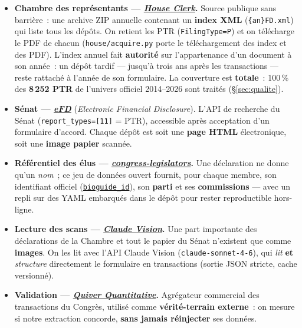 \documentclass[11pt,a4paper]{article}
\newcommand{\co}[1]{\texttt{\small #1}}
\begin{document}
\begin{itemize}[leftmargin=1.4em]
\item \textbf{Chambre des représentants — \href{https://disclosures-clerk.house.gov/FinancialDisclosure}{\emph{House Clerk}}.} Source publique sans barrière~: une archive
ZIP annuelle contenant un \textbf{index XML} (\co{\{an\}FD.xml}) qui liste tous les dépôts. On retient les
PTR (\co{FilingType=P}) et on télécharge le PDF de chacun (\co{house/acquire.py} porte le téléchargement
des index et des PDF). L'index annuel fait \textbf{autorité} sur l'appartenance d'un document à son
année~: un dépôt tardif — jusqu'à trois ans après les transactions — reste rattaché à l'année de son
formulaire. La couverture est \textbf{totale}~: 100\,\% des \textbf{8\,252 PTR} de l'univers officiel
2014--2026 sont traités (\S{}\ref{sec:qualite}).
\item \textbf{Sénat — \href{https://efdsearch.senate.gov/search/home/}{\emph{eFD}}} (\emph{Electronic Financial Disclosure}). L'API de recherche du Sénat
(\co{report_types=[11]} = PTR), accessible après acceptation d'un formulaire d'accord. Chaque dépôt est
soit une \textbf{page HTML} électronique, soit une \textbf{image papier} scannée.
\item \textbf{Référentiel des élus — \href{https://github.com/unitedstates/congress-legislators}{\emph{congress-legislators}}.}\label{sec:reference} Une déclaration ne
donne qu'un \emph{nom}~; ce jeu de données ouvert fournit, pour chaque membre, son identifiant officiel
(\href{https://bioguide.congress.gov/}{\co{bioguide_id}}), son \textbf{parti} et ses \textbf{commissions} — avec un repli sur des YAML embarqués
dans le dépôt pour rester reproductible hors-ligne.
\item \textbf{Lecture des scans — \href{https://www.anthropic.com}{\emph{Claude Vision}}.}\label{sec:vision} Une part importante des déclarations de la
Chambre et tout le papier du Sénat n'existent que comme \textbf{images}. On les lit avec l'API Claude
Vision (\co{claude-sonnet-4-6}), qui \emph{lit} \textbf{et} \emph{structure} directement le formulaire en
transactions (sortie JSON stricte, cache versionné).
\item \textbf{Validation — \href{https://www.quiverquant.com/congresstrading/}{\emph{Quiver Quantitative}}.} Agrégateur commercial des transactions du Congrès,
utilisé comme \textbf{vérité-terrain externe}~: on mesure si notre extraction concorde, \textbf{sans jamais
réinjecter} ses données.
\end{itemize}
\end{document}
